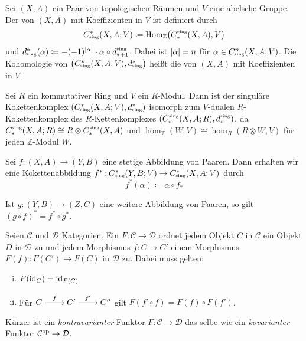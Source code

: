\begin{definition}[{name=[singulärer Kokettenkomplex]}]
	Sei $(X,A)$ ein Paar von topologischen Räumen und $V$ eine abelsche Gruppe. Der  von $(X,A)$ mit Koeffizienten in $V$ ist definiert durch
	\[
		C_\sing^*(X,A;V) \coloneqq \Hom_\mathbb{Z} \enbrace[\big]{C_*^\sing(X,A),V}
	\]
	und $d^*_\sing(\alpha) \coloneqq - (-1)^{\abs{\alpha}} \cdot \alpha \circ d_{*+1}^\sing$. Dabei ist $\lvert\alpha\rvert=n$ für $\alpha \in C^n_\sing(X,A;V)$. Die 
	Kohomologie von $\enbrace[\big]{C^*_\sing(X,A;V), d^*_\sing}$ heißt die  von $(X,A)$ mit Koeffizienten in $V$.
\end{definition}

\begin{bemerkung}[{name=[Isomorphie des singulären Kettenkomplexes]}]
	Sei $R$ ein kommutativer Ring und $V$ ein $R$-Modul. Dann ist der singuläre Kokettenkomplex
	\(
		\enbrace*{C^*_\sing(X,A;V), d^*_\sing}
	\)
	isomorph zum $V$-dualen $R$-Kokettenkomplex des $R$-Kettenkomplexes $\enbrace*{C^\sing_*(X,A;R), d^\sing_*}$, da $C^\sing_*(X,A;R) \cong R \otimes C^\sing_*(X,A)$ und
	$\hom_\mathbb{Z}(W,V) \cong \hom_R(R \otimes W,V)$ für jeden $\mathbb{Z}$-Modul $W$.
\end{bemerkung}


\begin{definition}[{name=[induzierte Abbildung auf Kokettenkomplexen]}]
	Sei $f \colon (X,A) \to (Y,B)$ eine stetige Abbildung von Paaren. Dann erhalten wir eine Kokettenabbildung $f^* \colon C^*_\sing(Y,B;V) \to C^*_\sing(X,A;V)$ durch
	\[
		f^*(\alpha) \coloneqq \alpha \circ f_*
	\]
\end{definition}

\begin{bemerkung}[{name=[Induzierte Abbildung einer Komposition]}]
	Ist $g \colon (Y,B) \to (Z,C)$ eine weitere Abbildung von Paaren, so gilt $(g \circ f)^* = f^* \circ g^*$.
\end{bemerkung}

\begin{definition}[{name=[kontravarianter Funktor]}]
	Seien $\mathcal{C}$ und $\mathcal{D}$ Kategorien. Ein   $F \colon \mathcal{C} \to \mathcal{D}$ ordnet jedem Objekt $C$ in $\mathcal{C}$ ein Objekt
	$D$ in $\mathcal{D}$ zu und jedem Morphismus $f \colon C \to C'$ einem Morphismus $F(f) \colon F(C') \to F(C)$ in $\mathcal{D}$ zu. Dabei muss gelten:
	\begin{enumerate}[i),noitemsep]
		\item $F(\operatorname{id}_C)= \operatorname{id}_{F(C)}$
		\item Für $\begin{tikzcd}[cramped] C \rar["f"] & C' \rar["f'"] & C'' \end{tikzcd}$ gilt $F(f' \circ f) = F(f) \circ F(f')$. 
	\end{enumerate}
	Kürzer ist ein \emph{kontravarianter} Funktor $F \colon \mathcal{C} \to \mathcal{D}$ das selbe wie ein \emph{kovarianter} Funktor $\mathcal{C}^{\mathrm{op}} \to \mathcal{D}$.
\end{definition}

